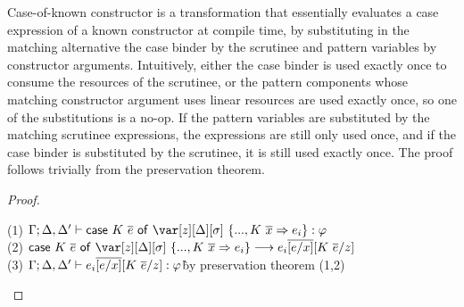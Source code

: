 Case-of-known constructor is a transformation that essentially evaluates a case
expression of a known constructor at compile time, by substituting in the
matching alternative the case binder by the scrutinee and pattern variables by
constructor arguments.
%
Intuitively, either the case binder is used exactly once to consume the
resources of the scrutinee, or the pattern components whose matching
constructor argument uses linear resources are used exactly once, so one of the
substitutions is a no-op.  If the pattern variables are substituted by the
matching scrutinee expressions, the expressions are still only used once, and
if the case binder is substituted by the scrutinee, it is still used exactly
once.
%
The proof follows trivially from the preservation theorem.


\CaseOfKnownConstructorTheorem

\begin{proof}~
\begin{tabbing}
    (1) $\G; \D, \D' \vdash \ccase{K~\ov{e}}{\z[\D][\s]~\{..., K~\ov{x} \Rightarrow e_i\}} : \vp$\\
    (2) $\ccase{K~\ov{e}}{\z[\D][\s]~\{..., K~\ov{x} \Rightarrow e_i\}} \longrightarrow e_i\ov{[e/x]}[K~\ov{e}/z]$\\
    (3) $\Gamma; \Delta,\Delta' \vdash e_i\overline{[e/x]}[K~\overline{e}/z] : \varphi$\` by preservation theorem (1,2)\\
\end{tabbing}
\end{proof}


